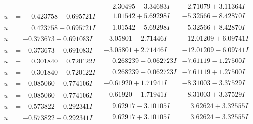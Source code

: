 \documentclass[1p]{elsarticle_modified}
\theoremstyle{definition}
\begin{document}
$$\begin{array}{c|c|c}
 & \phantom{-}2.30495 - 3.34683 I & -2.71079 + 3.11364 I \\ \hline\begin{aligned}
u &= \phantom{-}0.423758 + 0.695721 I\end{aligned}
 & \phantom{-}1.01542 + 5.69298 I & -5.32566 - 8.42870 I \\ \hline\begin{aligned}
u &= \phantom{-}0.423758 - 0.695721 I\end{aligned}
 & \phantom{-}1.01542 - 5.69298 I & -5.32566 + 8.42870 I \\ \hline\begin{aligned}
u &= -0.373673 + 0.691083 I\end{aligned}
 & -3.05801 - 2.71446 I & -12.01209 + 6.09741 I \\ \hline\begin{aligned}
u &= -0.373673 - 0.691083 I\end{aligned}
 & -3.05801 + 2.71446 I & -12.01209 - 6.09741 I \\ \hline\begin{aligned}
u &= \phantom{-}0.301840 + 0.720122 I\end{aligned}
 & \phantom{-}0.268239 - 0.062723 I & -7.61119 - 1.27500 I \\ \hline\begin{aligned}
u &= \phantom{-}0.301840 - 0.720122 I\end{aligned}
 & \phantom{-}0.268239 + 0.062723 I & -7.61119 + 1.27500 I \\ \hline\begin{aligned}
u &= -0.085060 + 0.774106 I\end{aligned}
 & -0.61920 + 1.71941 I & -8.31003 - 3.37529 I \\ \hline\begin{aligned}
u &= -0.085060 - 0.774106 I\end{aligned}
 & -0.61920 - 1.71941 I & -8.31003 + 3.37529 I \\ \hline\begin{aligned}
u &= -0.573822 + 0.292341 I\end{aligned}
 & \phantom{-}9.62917 - 3.10105 I & \phantom{-}3.62624 + 3.32555 I \\ \hline\begin{aligned}
u &= -0.573822 - 0.292341 I\end{aligned}
 & \phantom{-}9.62917 + 3.10105 I & \phantom{-}3.62624 - 3.32555 I \\ \hline\begin{aligned}

\end{aligned}
\end{array}$$
\end{document}
